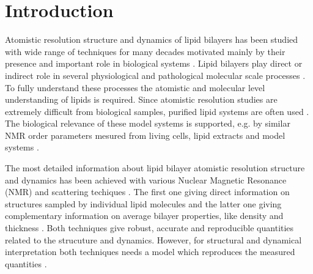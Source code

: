 \documentclass[aps,prl,superscriptaddress,twocolumn]{revtex4}
\begin{document}

\maketitle %



\section{Introduction}
Atomistic resolution structure and dynamics of lipid bilayers has been studied
with wide range of techniques for many decades motivated mainly
by their presence and important role in biological systems \cite{israelachvili80,jacobs81,davis83,bloom91,nagle00,??}.
Lipid bilayers play direct or indirect role in several physiological and pathological
molecular scale processes \cite{lee04,kinnunen09,??}. To fully understand these processes the atomistic and
molecular level understanding of lipids is required. Since atomistic resolution studies are
extremely difficult from biological samples, purified lipid systems are often used \cite{??}.
The biological relevance of these model systems is supported, e.g. by similar NMR order parameters 
mesured from living cells, lipid extracts and model systems \cite{??}. 

The most detailed information about lipid bilayer atomistic resolution structure and dynamics has been
achieved with various Nuclear Magnetic Resonance (NMR) and scattering techiques \cite{jacobs81,davis83,bloom91,nagle00,??}. 
The first one giving direct information on structures sampled by individual lipid molecules \cite{jacobs81,davis83,bloom91,??} and
the latter one giving complementary information on average bilayer properties, like density and thickness \cite{nagle00,??}.
Both techniques give robust, accurate and reproducible quantities related to the strucuture and dynamics.
However, for structural and dynamical interpretation both techniques needs a model which reproduces 
the measured quantities \cite{jacobs81,davis83,bloom91,nagle00,??}. 
\end{document}

